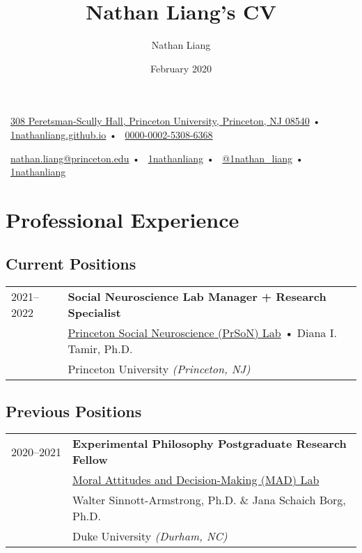 \documentclass[10pt,a4paper]{cv_public}
\title{Nathan Liang's CV}
\author{Nathan Liang}
\date{February 2020}
\begin{document}
\vspace{12pt}


{\footnotesize 
\textcolor{section_color}\faMapMarker \ \href{https://goo.gl/maps/dXgLDEejYuoQB6na9}{308 Peretsman-Scully Hall, Princeton University, Princeton, NJ 08540} {\color{grid_blue}•}
\textcolor{section_color} \faMousePointer \ \href{https://1nathanliang.github.io}{1nathanliang.github.io} {\color{grid_orange}•}
\textcolor{section_color}\aiOrcid \ \href{https://orcid.org/0000-0002-5308-6368}{0000-0002-5308-6368} \ 

\textcolor{section_color}\faEnvelopeSquare \ \href{mailto:nathan.liang@princeton.edu}{nathan.liang@princeton.edu} {\color{grid_green}•}
\textcolor{section_color}\faGithubSquare \ \href{http://github.com/1nathanliang}{1nathanliang} {\color{grid_red}•}
\textcolor{section_color}\faTwitterSquare \ \href{https://www.twitter.com/1nathan\_liang/}{@1nathan\_liang} {\color{grid_pink}•}
\textcolor{section_color}\faLinkedinSquare \ \href{https://www.linkedin.com/in/1nathanliang/}{1nathanliang}}


\section{Professional Experience}

\subsection{Current Positions}
\begin{tabular}{p{1in}<{\raggedleft\arraybackslash}p{4.935in}<{\raggedright\arraybackslash}}
2021–2022 & \textbf{Social Neuroscience Lab Manager + Research Specialist} \\
& {\href{https://psnlab.princeton.edu/}{Princeton Social Neuroscience (PrSoN) Lab}} • Diana I. Tamir, Ph.D. \\
& Princeton University \textit{(Princeton, NJ)} \\
\end{tabular}

\vspace{7.5pt}
\subsection{Previous Positions}
\begin{tabular}{p{1in}<{\raggedleft\arraybackslash}p{4.935in}<{\raggedright\arraybackslash}}
2020⁠–⁠2021 & \textbf{Experimental Philosophy Postgraduate Research Fellow} \\
& {\href{https://kenan.ethics.duke.edu/mad-lab/}{Moral Attitudes and Decision-Making (MAD) Lab}} \\
& Walter Sinnott-Armstrong, Ph.D. \& Jana Schaich Borg, Ph.D. \\
& Duke University \textit{(Durham, NC)} \\
\end{tabular}
\end{document}
